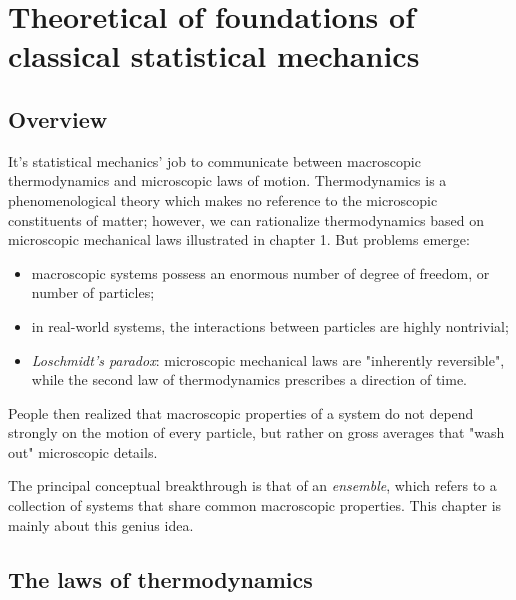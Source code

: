 
\chapter{Theoretical of foundations of classical statistical mechanics}

\section{Overview}

It's statistical mechanics' job to communicate between macroscopic thermodynamics and microscopic laws of motion. Thermodynamics is a phenomenological theory which makes no reference to the microscopic constituents of matter; however, we can rationalize thermodynamics based on microscopic mechanical laws illustrated in chapter 1. But problems emerge:
\begin{itemize}
	\item macroscopic systems possess an enormous number of degree of freedom, or number of particles;
	\item in real-world systems, the interactions between particles are highly nontrivial;
	\item \textit{Loschmidt's paradox}: microscopic mechanical laws are "inherently reversible", while the second law of thermodynamics prescribes a direction of time.
\end{itemize}
People then realized that macroscopic properties of a system do not depend strongly on the motion of every particle, but rather on gross averages that "wash out" microscopic details. 

The principal conceptual breakthrough is that of an \textit{ensemble}, which refers to a collection of systems that share common macroscopic properties. This chapter is mainly about this genius idea.

\section{The laws of thermodynamics}


